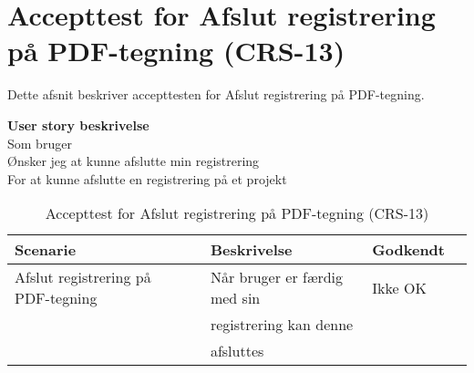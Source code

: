 \section{Accepttest for Afslut registrering på PDF-tegning (CRS-13)}
Dette afsnit beskriver accepttesten for Afslut registrering på PDF-tegning.

\textbf{User story beskrivelse} \\
Som bruger \\
Ønsker jeg at kunne afslutte min registrering \\
For at kunne afslutte en registrering på et projekt

\begin{table}[H]
	\centering
	\begin{tabular}{|ll|l|ll|} \hline
		\textbf{Scenarie} &  & \textbf{Beskrivelse}&  \textbf{Godkendt}&  \\ \hline
		Afslut registrering på PDF-tegning&  &  Når bruger er færdig med sin &  Ikke OK&  \\
		& & registrering kan denne& & \\
		& & afsluttes& & \\ \hline
	\end{tabular}
	\caption{Accepttest for Afslut registrering på PDF-tegning (CRS-13)}
	\label{AcceptAfslutPDF}
\end{table}